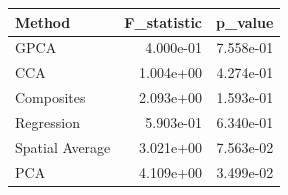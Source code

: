 \begin{tabular}{lrr}
\toprule
Method & F_statistic & p_value \\
\midrule
GPCA & 4.000e-01 & 7.558e-01 \\
CCA & 1.004e+00 & 4.274e-01 \\
Composites & 2.093e+00 & 1.593e-01 \\
Regression & 5.903e-01 & 6.340e-01 \\
Spatial Average & 3.021e+00 & 7.563e-02 \\
PCA & 4.109e+00 & 3.499e-02 \\
\bottomrule
\end{tabular}
